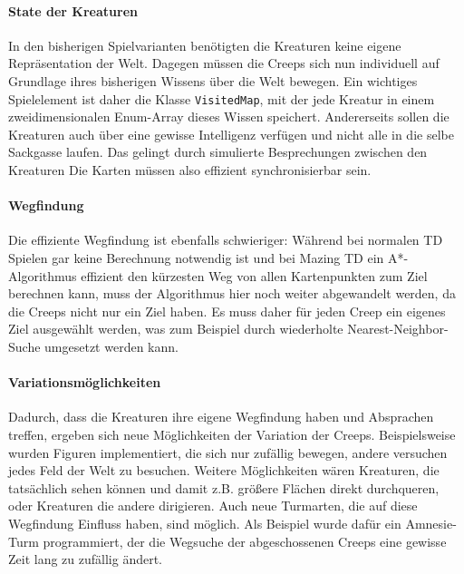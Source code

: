 
\paragraph{State der Kreaturen} In den bisherigen Spielvarianten benötigten die Kreaturen keine eigene Repräsentation der Welt. Dagegen müssen die Creeps sich nun individuell auf Grundlage ihres bisherigen Wissens über die Welt bewegen. Ein wichtiges Spielelement ist daher die Klasse \lstinline{VisitedMap}, mit der jede Kreatur in einem zweidimensionalen Enum-Array dieses Wissen speichert. Andererseits sollen die Kreaturen auch über eine gewisse Intelligenz verfügen und nicht alle in die selbe Sackgasse laufen. Das gelingt durch simulierte Besprechungen zwischen den Kreaturen Die Karten müssen also effizient synchronisierbar sein. 

\paragraph{Wegfindung} Die effiziente Wegfindung ist ebenfalls schwieriger: Während bei normalen TD Spielen gar keine Berechnung notwendig ist und bei Mazing TD ein A*-Algorithmus effizient den kürzesten Weg von allen Kartenpunkten zum Ziel berechnen kann, muss der Algorithmus hier noch weiter abgewandelt werden, da die Creeps nicht nur ein Ziel haben. Es muss daher für jeden Creep ein eigenes Ziel ausgewählt werden, was zum Beispiel durch wiederholte Nearest-Neighbor-Suche umgesetzt werden kann.

\paragraph{Variationsmöglichkeiten} Dadurch, dass die Kreaturen ihre eigene Wegfindung haben und Absprachen treffen, ergeben sich neue Möglichkeiten der Variation der Creeps. Beispielsweise wurden Figuren implementiert, die sich nur zufällig bewegen, andere versuchen jedes Feld der Welt zu besuchen. Weitere Möglichkeiten wären Kreaturen, die tatsächlich sehen können und damit z.B. größere Flächen direkt durchqueren, oder Kreaturen die andere dirigieren. Auch neue Turmarten, die auf diese Wegfindung Einfluss haben, sind möglich. Als Beispiel wurde dafür ein Amnesie-Turm programmiert, der die Wegsuche der abgeschossenen Creeps eine gewisse Zeit lang zu zufällig ändert.

